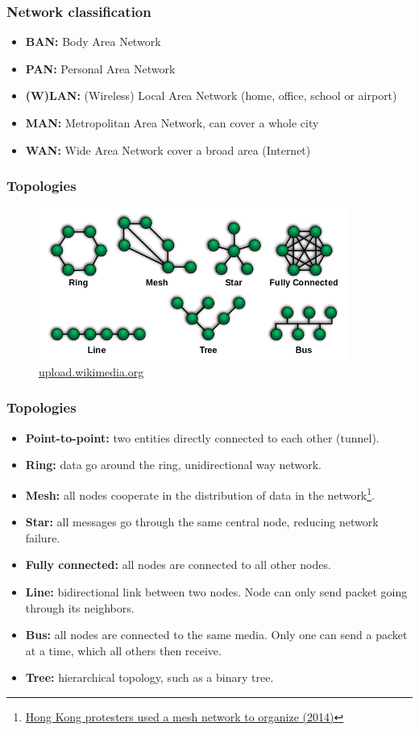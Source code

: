   \begin{frame}
    \frametitle{Network classification}
      \begin{itemize}
        \item \textbf{BAN:} Body Area Network
        \item \textbf{PAN:} Personal Area Network
        \item \textbf{(W)LAN:} (Wireless) Local Area Network (home, office, school or airport)
        \item \textbf{MAN:} Metropolitan Area Network, can cover a whole city
        \item \textbf{WAN:} Wide Area Network cover a broad area (Internet)
      \end{itemize}
  \end{frame}
  \begin{frame}
    \frametitle{Topologies}
    \begin{figure}[t]
      \centering
      \includegraphics[height=5cm]{./imgs/topologies.png}
      \caption{\color{blue}\href{https://upload.wikimedia.org/wikipedia/commons/thumb/9/97/NetworkTopologies.svg/640px-NetworkTopologies.svg.png}{upload.wikimedia.org}}
      \label{fig:topologies}
    \end{figure}
  \end{frame}
  \begin{frame}
    \frametitle{Topologies}
    \begin{itemize}
      \item \textbf{Point-to-point:} two entities directly connected to each other (tunnel).
      \item \textbf{Ring:} data go around the ring, unidirectional way network.
      \item \textbf{Mesh:} all nodes cooperate in the distribution of data in the network\footnote{\color{blue}\href{http://www.newscientist.com/article/dn26285-hong-kong-protesters-use-a-mesh-network-to-organise.html}{Hong Kong protesters used a mesh network to organize (2014)}}.
      \item \textbf{Star:} all messages go through the same central node, reducing network failure.
      \item \textbf{Fully connected:} all nodes are connected to all other nodes.
      \item \textbf{Line:} bidirectional link between two nodes. Node can only send packet going through its neighbors.
      \item \textbf{Bus:} all nodes are connected to the same media. Only one can send a packet at a time, which all others then receive.
      \item \textbf{Tree:} hierarchical topology, such as a binary tree.
    \end{itemize}
  \end{frame}
